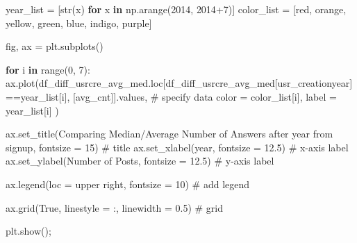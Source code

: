 \documentclass[
  letterpaper,
  DIV=11,
  numbers=noendperiod]{scrartcl}
\newenvironment{Shaded}{\begin{snugshade}}{\end{snugshade}}
\newcommand{\BuiltInTok}[1]{\textcolor[rgb]{0.00,0.23,0.31}{#1}}
\newcommand{\CommentTok}[1]{\textcolor[rgb]{0.37,0.37,0.37}{#1}}
\newcommand{\ControlFlowTok}[1]{\textcolor[rgb]{0.00,0.23,0.31}{\textbf{#1}}}
\newcommand{\DecValTok}[1]{\textcolor[rgb]{0.68,0.00,0.00}{#1}}
\newcommand{\FloatTok}[1]{\textcolor[rgb]{0.68,0.00,0.00}{#1}}
\newcommand{\KeywordTok}[1]{\textcolor[rgb]{0.00,0.23,0.31}{\textbf{#1}}}
\newcommand{\NormalTok}[1]{\textcolor[rgb]{0.00,0.23,0.31}{#1}}
\newcommand{\OperatorTok}[1]{\textcolor[rgb]{0.37,0.37,0.37}{#1}}
\newcommand{\StringTok}[1]{\textcolor[rgb]{0.13,0.47,0.30}{#1}}
\newcommand{\VariableTok}[1]{\textcolor[rgb]{0.07,0.07,0.07}{#1}}
\begin{document}
\begin{Shaded}
\begin{Highlighting}[]
\NormalTok{year\_list }\OperatorTok{=}\NormalTok{ [}\BuiltInTok{str}\NormalTok{(x) }\ControlFlowTok{for}\NormalTok{ x }\KeywordTok{in}\NormalTok{ np.arange(}\DecValTok{2014}\NormalTok{, }\DecValTok{2014}\OperatorTok{+}\DecValTok{7}\NormalTok{)]}
\NormalTok{color\_list }\OperatorTok{=}\NormalTok{ [}\StringTok{\textquotesingle{}red\textquotesingle{}}\NormalTok{, }\StringTok{\textquotesingle{}orange\textquotesingle{}}\NormalTok{, }\StringTok{\textquotesingle{}yellow\textquotesingle{}}\NormalTok{, }\StringTok{\textquotesingle{}green\textquotesingle{}}\NormalTok{, }\StringTok{\textquotesingle{}blue\textquotesingle{}}\NormalTok{, }\StringTok{\textquotesingle{}indigo\textquotesingle{}}\NormalTok{, }\StringTok{\textquotesingle{}purple\textquotesingle{}}\NormalTok{]}

\NormalTok{fig, ax }\OperatorTok{=}\NormalTok{ plt.subplots()}

\ControlFlowTok{for}\NormalTok{ i }\KeywordTok{in} \BuiltInTok{range}\NormalTok{(}\DecValTok{0}\NormalTok{, }\DecValTok{7}\NormalTok{):    }
\NormalTok{        ax.plot(df\_diff\_usrcre\_avg\_med.loc[df\_diff\_usrcre\_avg\_med[}\StringTok{\textquotesingle{}usr\_creationyear\textquotesingle{}}\NormalTok{]}\OperatorTok{==}\NormalTok{year\_list[i], [}\StringTok{\textquotesingle{}avg\_cnt\textquotesingle{}}\NormalTok{]].values, }\CommentTok{\# specify data}
\NormalTok{                color }\OperatorTok{=}\NormalTok{ color\_list[i],}
\NormalTok{                label }\OperatorTok{=}\NormalTok{ year\_list[i]}
\NormalTok{        ) }

\NormalTok{ax.set\_title(}\StringTok{\textquotesingle{}Comparing Median/Average Number of Answers after year from signup\textquotesingle{}}\NormalTok{, fontsize }\OperatorTok{=} \DecValTok{15}\NormalTok{) }\CommentTok{\# title}
\NormalTok{ax.set\_xlabel(}\StringTok{\textquotesingle{}year\textquotesingle{}}\NormalTok{, fontsize }\OperatorTok{=} \FloatTok{12.5}\NormalTok{) }\CommentTok{\# x{-}axis label}
\NormalTok{ax.set\_ylabel(}\StringTok{\textquotesingle{}Number of Posts\textquotesingle{}}\NormalTok{, fontsize }\OperatorTok{=} \FloatTok{12.5}\NormalTok{) }\CommentTok{\# y{-}axis label}

\NormalTok{ax.legend(loc }\OperatorTok{=} \StringTok{\textquotesingle{}upper right\textquotesingle{}}\NormalTok{, fontsize }\OperatorTok{=} \DecValTok{10}\NormalTok{) }\CommentTok{\# add legend}

\NormalTok{ax.grid(}\VariableTok{True}\NormalTok{, linestyle }\OperatorTok{=} \StringTok{\textquotesingle{}:\textquotesingle{}}\NormalTok{, linewidth }\OperatorTok{=} \FloatTok{0.5}\NormalTok{) }\CommentTok{\# grid}

\NormalTok{plt.show()}\OperatorTok{;}
\end{Highlighting}
\end{Shaded}
\end{document}
